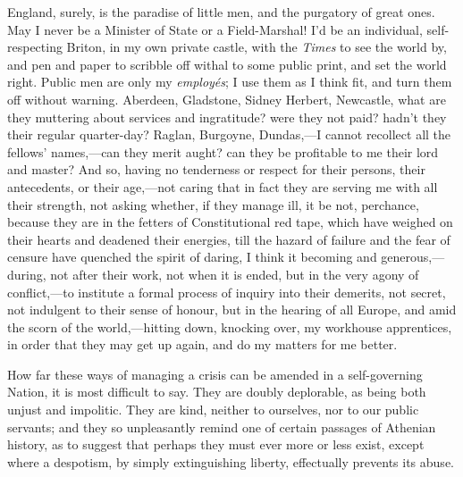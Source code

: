 England, surely, is the paradise of little men,
and the purgatory of great ones. May I never be a Minister of State or
a Field-Marshal! I'd be an individual, self-respecting Briton, in my
own private castle, with the \emph{Times} to see the world by, and pen
and paper to scribble off withal to some public print, and set the
world right. Public men are only my \emph{employés}; I use them as I
think fit, and turn them off without warning. Aberdeen, Gladstone,
Sidney Herbert, Newcastle, what are they muttering about services and
ingratitude? were they not paid? hadn't they their regular
quarter-day? Raglan, Burgoyne, Dundas,—I cannot recollect all the
fellows' names,—can they merit aught? can they be profitable to me
their lord and master? And so, having no tenderness or respect for
their persons, their antecedents, or their age,—not caring that in
fact they are serving me with all their strength, not asking whether,
if they manage ill, it be not, perchance, because they are in the
fetters of Constitutional red tape, which have weighed on their hearts
and deadened their energies, till the hazard of failure and the fear
of censure have quenched the spirit of daring, I think it
becoming and generous,—during, not after their work, not when it is
ended, but in the very agony of conflict,—to institute a formal
process of inquiry into their demerits, not secret, not indulgent to
their sense of honour, but in the hearing of all Europe, and amid the
scorn of the world,—hitting down, knocking over, my workhouse
apprentices, in order that they may get up again, and do my matters
for me better.

How far these ways of managing a crisis can be
amended in a self-governing Nation, it is most difficult to say. They
are doubly deplorable, as being both unjust and impolitic. They are
kind, neither to ourselves, nor to our public servants; and they so
unpleasantly remind one of certain passages of Athenian history, as to
suggest that perhaps they must ever more or less exist, except where a
despotism, by simply extinguishing liberty, effectually prevents its
abuse.


